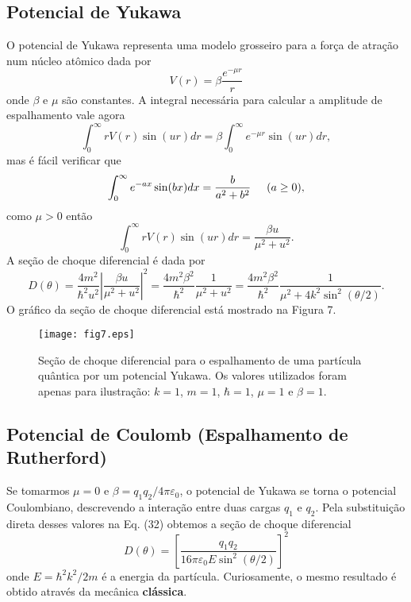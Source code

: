 \documentclass{article}
\begin{document}
\subsection{Potencial de Yukawa}

O potencial de Yukawa representa uma modelo grosseiro para a força de atração num núcleo atômico dada por
\begin{equation}
    V(r) = \beta\frac{e^{-\mu r}}{r}
\end{equation}
onde $\beta$ e $\mu$ são constantes. A integral necessária para calcular a amplitude de espalhamento vale agora
\begin{equation}
\int_{0}^{\infty} r V(r) \sin\left( u r \right) dr = \beta\int_0^{\infty} e^{-\mu r}\sin(ur)dr,   
\end{equation}
mas é fácil verificar que
\begin{equation}
    \int_0^{\infty}e^{-a x}\sin(bx) dx = \frac{b}{a^2 + b^2} \hspace{0.5cm} (a\geq 0),
\end{equation}
como $\mu>0$ então
\begin{equation}
\int_{0}^{\infty} r V(r) \sin\left( u r \right) dr =   \frac{\beta u}{\mu^2 + u^2}.  
\end{equation}
A seção de choque diferencial é dada por
\begin{equation}
    D(\theta) = \frac{4m^2}{\hbar^2 u^2} \left| \frac{\beta u}{\mu^2 + u^2} \right|^{2} = \frac{4 m^2 \beta^2}{\hbar^2} \frac{1}{\mu^2 + u^2} = \frac{4 m^2 \beta^2}{\hbar^2} \frac{1}{\mu^2 + 4k^2 \sin^2 (\theta/2)}.
\end{equation}
O gráfico da seção de choque diferencial está mostrado na Figura 7.

\begin{figure}[h]
\centering
\texttt{[image: fig7.eps]}
\caption{Seção de choque diferencial para o espalhamento de uma partícula quântica por um potencial Yukawa. Os valores utilizados foram apenas para ilustração: $k = 1$, $m = 1$, $\hbar = 1$, $\mu = 1$ e $\beta = 1$.}
\end{figure}

\subsection{Potencial de Coulomb (Espalhamento de Rutherford)}

Se tomarmos $\mu = 0$ e $\beta = q_1 q_2 /4\pi\varepsilon_0$, o potencial de Yukawa se torna o potencial Coulombiano, descrevendo a interação entre duas cargas $q_1$ e $q_2$. Pela substituição direta desses valores na Eq. (32) obtemos a seção de choque diferencial 
\begin{equation}
    D(\theta) = \left[ \frac{q_1 q_2}{16 \pi \varepsilon_0 E \sin^2 (\theta/2)} \right]^2
\end{equation}
onde $E = \hbar^2 k^2 /2m$ é a energia da partícula. Curiosamente, o mesmo resultado é obtido através da mecânica \textbf{clássica}.
\end{document}
